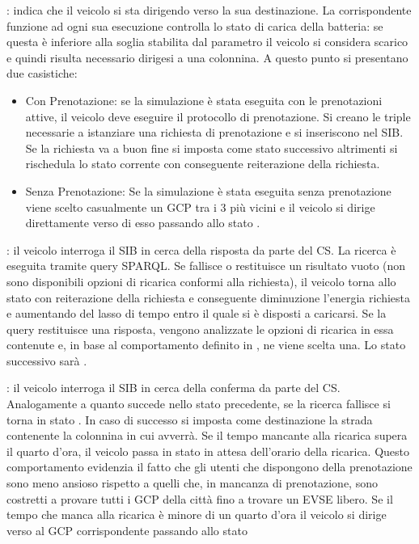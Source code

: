 \begin{description}
	\item \label{state:driving} : indica che il veicolo si sta dirigendo verso la sua destinazione. La corrispondente funzione  ad ogni sua esecuzione controlla lo stato di carica della batteria: se questa è inferiore alla soglia stabilita dal parametro  il veicolo si considera scarico e quindi risulta necessario dirigesi a una colonnina. A questo punto si presentano due casistiche:
	\begin{itemize}
		\item{Con Prenotazione}: se la simulazione è stata eseguita con le prenotazioni attive, il veicolo deve eseguire il protocollo di prenotazione. Si creano le triple necessarie a istanziare una richiesta di prenotazione e si inseriscono nel SIB. Se la richiesta va a buon fine si imposta come stato successivo  altrimenti si rischedula  lo stato corrente con conseguente reiterazione della richiesta.
		\item{Senza Prenotazione}: Se la simulazione è stata eseguita senza prenotazione viene scelto casualmente un GCP tra i 3 più vicini e il veicolo si dirige direttamente verso di esso passando allo stato .
	\end{itemize}
	\item {}: il veicolo interroga il SIB in cerca della risposta da parte del CS. La ricerca è eseguita tramite query SPARQL. Se fallisce o restituisce un risultato vuoto (non sono disponibili opzioni di ricarica conformi alla richiesta), il veicolo torna allo stato  con reiterazione della richiesta e conseguente diminuzione l'energia richiesta e aumentando del lasso di tempo entro il quale si è disposti a caricarsi. Se la query restituisce una risposta, vengono analizzate le opzioni di ricarica in essa contenute e, in base al comportamento definito in , ne viene scelta una. Lo stato successivo sarà  .
	\item {}: il veicolo interroga il SIB in cerca della conferma da parte del CS. Analogamente a quanto succede nello stato precedente, se la ricerca fallisce si torna in stato . In caso di successo si imposta come destinazione la strada contenente la colonnina in cui avverrà. Se il tempo mancante alla ricarica supera il quarto d'ora, il veicolo passa in stato  in attesa dell'orario della ricarica. Questo comportamento evidenzia il fatto che gli utenti che dispongono della prenotazione sono meno ansioso rispetto a quelli che, in mancanza di prenotazione, sono costretti a provare tutti i GCP della città fino a trovare un EVSE libero. Se il tempo che manca alla ricarica è minore di un quarto d'ora il veicolo si dirige verso al GCP corrispondente passando allo stato 

\end{description}
